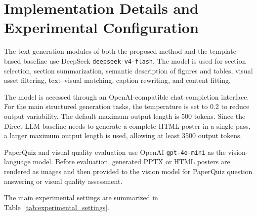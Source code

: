 \documentclass[12pt,oneside]{report}
\begin{document}
\section{Implementation Details and Experimental Configuration}

The text generation modules of both the proposed method and the template-based baseline use DeepSeek \texttt{deepseek-v4-flash}. The model is used for section selection, section summarization, semantic description of figures and tables, visual asset filtering, text--visual matching, caption rewriting, and content fitting.

\vspace{1em}

The model is accessed through an OpenAI-compatible chat completion interface. For the main structured generation tasks, the temperature is set to 0.2 to reduce output variability. The default maximum output length is 500 tokens. Since the Direct LLM baseline needs to generate a complete HTML poster in a single pass, a larger maximum output length is used, allowing at least 3500 output tokens.

\vspace{1em}

PaperQuiz and visual quality evaluation use OpenAI \texttt{gpt-4o-mini} as the vision-language model. Before evaluation, generated PPTX or HTML posters are rendered as images and then provided to the vision model for PaperQuiz question answering or visual quality assessment.

\vspace{1em}

The main experimental settings are summarized in Table~\ref{tab:experimental_settings}.
\end{document}
